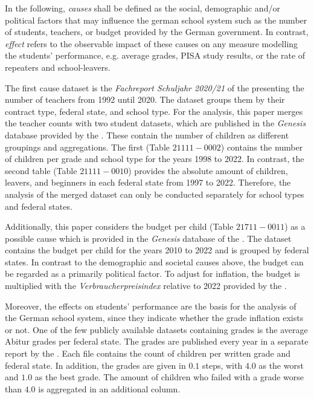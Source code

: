 In the following, \emph{causes} shall be defined as the social, demographic and/or political factors that may influence the german school system such as the number of students, teachers, or budget provided by the German government. In contrast, \emph{effect} refers to the observable impact of these causes on any measure modelling the students' performance, e.g. average grades, PISA study results, or the rate of repeaters and school-leavers.

The first cause dataset is the \textit{Fachreport Schuljahr 2020/21} of the \citeauthor{statistische_bundesamt_allgemeinbildende_2022} presenting the number of teachers from 1992 until 2020. The dataset groups them by their contract type, federal state, and school type. For the analysis, this paper merges the teacher counts with two student datasets, which are published in the \textit{Genesis} database provided by the \citeauthor{statistische_bundesamt_statistisches_2023}. These contain the number of children as different groupings and aggregations. The first (Table $21111-0002$) contains the number of children per grade and school type  for the years 1998 to 2022. In contrast, the second table (Table $21111-0010$) provides the absolute amount of children, leavers, and beginners in each federal state from 1997 to 2022. Therefore, the analysis of the merged dataset can only be conducted separately for school types and federal states.

Additionally, this paper considers the budget per child (Table $21711-0011$) as a possible cause which is provided in the \textit{Genesis} database of the \citeauthor{statistische_bundesamt_statistisches_2023}. The dataset contains the budget per child for the years 2010 to 2022 and is grouped by federal states. In contrast to the demographic and societal causes above, the budget can be regarded as a primarily political factor. To adjust for inflation, the budget is multiplied with the \textit{Verbraucherpreisindex} relative to 2022 provided by the \citeauthor{statistische_bundesamt_statistisches_2023}. 


Moreover, the effects on students' performance are the basis for the analysis of the German school system, since they indicate whether the grade inflation exists or not. One of the few publicly available datasets containing grades is the average Abitur grades per federal state. The grades are published every year in a separate report by the \citeauthor{kultusminister_konferenz_abiturnoten_nodate}. Each file contains the count of children per written grade and federal state. In addition, the grades are given in $0.1$ steps, with $4.0$ as the worst and $1.0$ as the best grade. The amount of children who failed with a grade worse than $4.0$ is aggregated in an additional column. 

